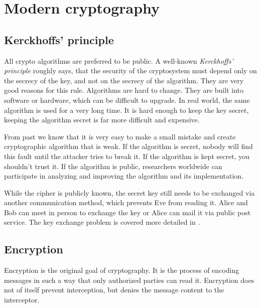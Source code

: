 \chapter{Modern cryptography}

\section{Kerckhoffs' principle}
\label{toc/kerckhoffs-principle}

All crypto algorithms are preferred to be public. A well-known \textit{Kerckhoffs' principle} roughly says, that the security of the cryptosystem must depend only on the secrecy of the key, and not on the secrecy of the algorithm. They are very good reasons for this rule. Algorithms are hard to change. They are built into software or hardware, which can be difficult to upgrade. In real world, the same algorithm is used for a very long time. It is hard enough to keep the key secret, keeping the algorithm secret is far more difficult and expensive.

From past we know that it is very easy to make a small mistake and create cryptographic algorithm that is weak. If the algorithm is secret, nobody will find this fault until the attacker tries to break it. If the algorithm is kept secret, you shouldn't trust it. If the algorithm is public, researchers worldwide can participate in analyzing and improving the algorithm and its implementation.

While the cipher is publicly known, the secret key still needs to be exchanged via another communication method, which prevents Eve from reading it. Alice and Bob can meet in person to exchange the key or Alice can mail it via public post service. The key exchange problem is covered more detailed in .

\section{Encryption}
\label{toc/encryption}

Encryption is the original goal of cryptography. It is the process of encoding messages in such a way that only authorized parties can read it. Encryption does not of itself prevent interception, but denies the message content to the interceptor.


